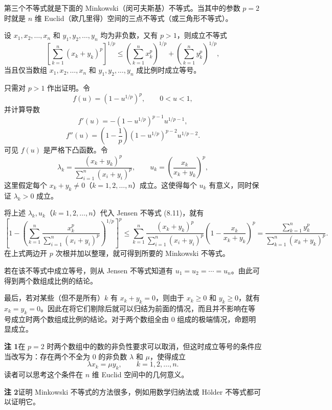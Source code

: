 第三个不等式就是下面的 Minkowski（闵可夫斯基）不等式。当其中的参数 $p=2$ 时就是 $n$ 维 Euclid（欧几里得）空间的三点不等式（或三角形不等式）。

\begin{xtheorem}
设 $x_1,x_2,\ldots,x_n$ 和 $y_1,y_2,\ldots,y_n$ 均为非负数，又有 $p>1$，则成立不等式
\begin{equation}
  \left[\sum_{k=1}^n(x_k+y_k)^p\right]^{1/p}
  \le\left(\sum_{k=1}^n x_k^p\right)^{1/p}
  +\left(\sum_{k=1}^n y_k^p\right)^{1/p},
  \tag{8.18}
  \label{eq:8.18}
\end{equation}
当且仅当数组 $x_1,x_2,\ldots,x_n$ 和 $y_1,y_2,\ldots,y_n$ 成比例时成立等号。
\end{xtheorem}
\begin{xproof}
只需对 $p>1$ 作出证明。令
\[
  f(u)=\left(1-u^{1/p}\right)^p,\qquad0<u<1,
\]
并计算导数
\[
  f'(u)=-\left(1-u^{1/p}\right)^{p-1}u^{1/p-1},
\]
\[
  f''(u)=\left(1-\frac1p\right)\left(1-u^{1/p}\right)^{p-2}u^{1/p-2}.
\]
可见 $f(u)$ 是严格下凸函数。令
\[
  \lambda_k=\frac{(x_k+y_k)^p}{\sum_{i=1}^n(x_i+y_i)^p},
  \qquad
  u_k=\left(\frac{x_k}{x_k+y_k}\right)^p,
\]
这里假定每个 $x_k+y_k\ne0$（$k=1,2,\ldots,n$）成立。这使得每个 $u_k$ 有意义，同时保证 $\lambda_k>0$ 成立。

将上述 $\lambda_k,u_k$（$k=1,2,\ldots,n$）代入 Jensen 不等式 (8.11)，就有
\[
  \left[
    1-\left(\sum_{k=1}^n\frac{x_k^p}{\sum_{i=1}^n(x_i+y_i)^p}\right)^{1/p}
  \right]^p
  \le\sum_{k=1}^n\frac{(x_k+y_k)^p}{\sum_{i=1}^n(x_i+y_i)^p}
  \left(1-\frac{x_k}{x_k+y_k}\right)^p
  =\frac{\sum_{k=1}^n y_k^p}{\sum_{k=1}^n(x_k+y_k)^p}.
\]
在上式两边开 $p$ 次根并加以整理，就可得到所要的 Minkowski 不等式。

若在该不等式中成立等号，则从 Jensen 不等式知道有 $u_1=u_2=\cdots=u_n$。由此可得到两个数组成比例的结论。

最后，若对某些（但不是所有）$k$ 有 $x_k+y_k=0$，则由于 $x_k\ge0$ 和 $y_k\ge0$，就有 $x_k=y_k=0$。因此在将它们剔除后就可以归结为前面的情况，而且并不影响在等号成立时两个数组成比例的结论。对于两个数组全由 0 组成的极端情况，命题明显成立。
\end{xproof}

\begin{xremark}
\textbf{注 1}\quad 在 $p=2$ 时两个数组中的数的非负性要求可以取消，但这时成立等号的条件应当改写为：存在两个不全为 0 的非负数 $\lambda$ 和 $\mu$，使得成立
\[
  \lambda x_k=\mu y_k,\qquad k=1,2,\ldots,n.
\]
读者可以思考这个条件在 $n$ 维 Euclid 空间中的几何意义。

\textbf{注 2}\quad 证明 Minkowski 不等式的方法很多，例如用数学归纳法或 Hölder 不等式都可以证明它。
\end{xremark}

